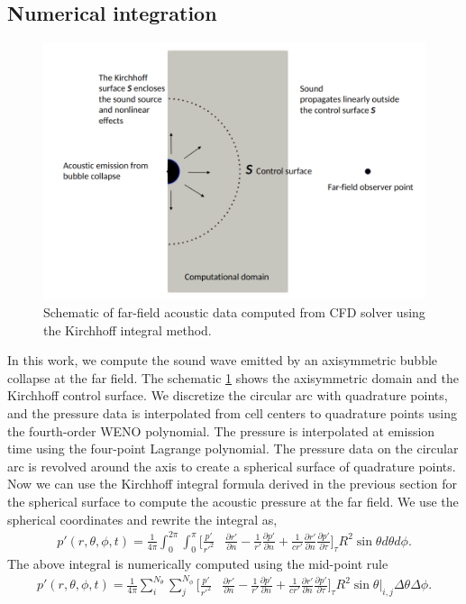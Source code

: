 \documentclass[12pt]{article}
\begin{document}
\subsection{Numerical integration}
\begin{figure}[h!]
	\centering
	\includegraphics[scale=0.3]{images/schematic.png}
	\caption{Schematic of far-field acoustic data computed from CFD solver using the Kirchhoff integral method.}
	\label{schematic}
\end{figure}
In this work, we compute the sound wave emitted by an axisymmetric bubble collapse at the far field. The schematic \ref{schematic} shows the axisymmetric domain and the Kirchhoff control surface. We discretize the circular arc with quadrature points, and the pressure data is interpolated from cell centers to quadrature points using the fourth-order WENO polynomial. The pressure is interpolated at emission time using the four-point Lagrange polynomial. The pressure data on the circular arc is revolved around the axis to create a spherical surface of quadrature points. Now we can use the Kirchhoff integral formula derived in the previous section for the spherical surface to compute the acoustic pressure at the far field. We use the spherical coordinates and rewrite the integral as,
\begin{equation}
	\begin{split}
		p'(r, \theta, \phi,t) =  \frac{1}{4\pi}\int_{0}^{2\pi}\int_{0}^{\pi}\Big[  \frac{p'}{r'^{2}}&\frac{\partial r'}{\partial n} - \frac{1}{r'}\frac{\partial p'}{\partial n} + \frac{1}{c r'}\frac{\partial r'}{\partial n}\frac{\partial p'}{\partial \tau} \Big]_{\tau} R^2\sin\theta d\theta d \phi.  
	\end{split} 
\end{equation}
The above integral is numerically computed using the mid-point rule 
\begin{equation}
	\begin{split}
		p'(r, \theta, \phi,t) =  \frac{1}{4\pi} \sum_{i}^{N_{\theta}}\sum_{j}^{N_{\phi}}  \Big[  \frac{p'}{r'^{2}}&\frac{\partial r'}{\partial n} - \frac{1}{r'}\frac{\partial p'}{\partial n} + \frac{1}{c r'}\frac{\partial r'}{\partial n}\frac{\partial p'}{\partial \tau} \Big]_{\tau} R^2\sin\theta \Big|_{i, j} \Delta \theta \Delta \phi.  
	\end{split} 
\end{equation}
\end{document}
